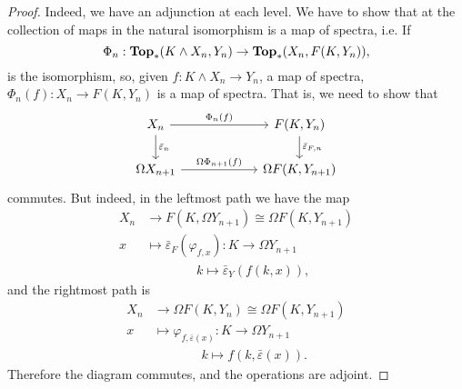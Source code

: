 \documentclass[a4paper,english,11pt]{article}
\theoremstyle{definition}
\theoremstyle{plain}
\theoremstyle{remark}
\newcommand{\Top}{\textbf{\text{Top}}}
\newcommand{\astruc}{\bar{\varepsilon}}
\begin{document}
\begin{proof}
  Indeed, we have an adjunction at each level. We have to show that at the collection of maps in the natural isomorphism is a map of spectra, i.e. If
  \[\Phi_n:\Top_\ast(K\wedge X_n,Y_n)\to \Top_\ast(X_n,F(K,Y_n)),\]
  is the isomorphism, so, given \(f:K\wedge X_n\to Y_n\), a map of spectra, \(\Phi_n(f):X_n\to F(K,Y_n)\) is a map of spectra. That is, we need to show that 
\begin{equation*}
    \begin{tikzcd}
      X_n\arrow{rr}{\Phi_n(f)}\arrow{d}{\astruc_n}&\ & F(K,Y_n)\arrow{d}{\astruc_{F,n}}\\
      \Omega X_{n+1}\arrow{rr}{\Omega\Phi_{n+1}(f)}&\ & \Omega F(K,Y_{n+1})
    \end{tikzcd}
\end{equation*}
commutes. But indeed, in the leftmost path we have the map
\begin{align*}
  X_n &\to F(K,\Omega Y_{n+1})\cong \Omega F(K,Y_{n+1}) \\
  x &\mapsto \astruc_F(\varphi_{f,x}):K\to \Omega Y_{n+1}\\
  &\ \ \ \ \ \ \ \ \ \ \ \ \ \ \ \ \ \ k \mapsto \astruc_{Y} (f(k,x)),
\end{align*}
and the rightmost path is 
\begin{align*}
  X_n &\to \Omega F(K,Y_n)\cong \Omega F(K,Y_{n+1}) \\
  x &\mapsto \varphi_{f,\astruc(x)}:K\to \Omega Y_{n+1}\\
  &\ \ \ \ \ \ \ \ \ \ \ \ \ \ \ \ \ k\mapsto f(k,\astruc(x)).
\end{align*}
Therefore the diagram commutes, and the operations are adjoint.


\end{proof}
\end{document}
